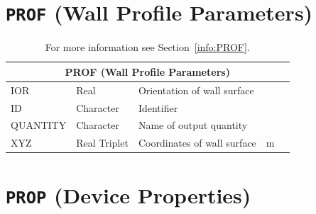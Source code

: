 \documentclass[11pt]{book}
\begin{document}
\vspace{\baselineskip}

\vfill

\section{\texorpdfstring{{\tt PROF}}{PROF} (Wall Profile Parameters)}

\hspace{1in}

\begin{table}[H]
\caption{For more information see Section~\ref{info:PROF}.}\label{tbl:PROF}
\noindent
\begin{tabular*}{\textwidth}{@{\extracolsep{\fill}}|l|l|l|l|l|}
\hline
\multicolumn{5}{|c|}{{\ct PROF} (Wall Profile Parameters)} \\ \hline \hline
{\ct IOR}      & Real             & Orientation of wall surface      &            &     \\ \hline
{\ct ID}       & Character        & Identifier                       &            &     \\ \hline
{\ct QUANTITY} & Character        & Name of output quantity          &            &     \\ \hline
{\ct XYZ}      & Real Triplet     & Coordinates of wall surface      & m          &     \\ \hline
\end{tabular*}
\end{table}

\vspace{\baselineskip}

\vfill

\section{\texorpdfstring{{\tt PROP}}{PROP} (Device Properties)}

\hspace{1in}
\end{document}
